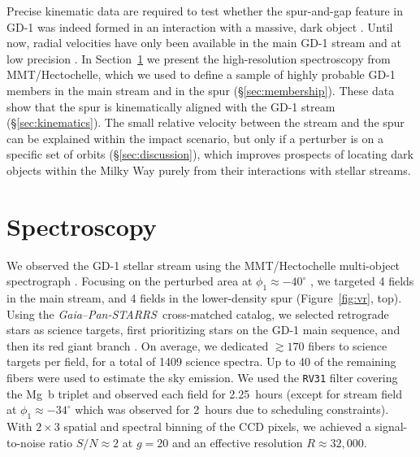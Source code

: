 \documentclass[twocolumn]{aastex63}
\newcommand{\gaia}{\textsl{Gaia}}
\newcommand{\pans}{\textsl{Pan-STARRS}}
\begin{document}
Precise kinematic data are required to test whether the spur-and-gap feature in GD-1 was indeed formed in an interaction with a massive, dark object \citep{bonaca2019a}.
Until now, radial velocities have only been available in the main GD-1 stream and at low precision \citep{koposov2010,huang2019}.
In Section~\ref{sec:spec} we present the high-resolution spectroscopy from MMT/Hectochelle, which we used to define a sample of highly probable GD-1 members in the main stream and in the spur (\S\ref{sec:membership}).
These data show that the spur is kinematically aligned with the GD-1 stream (\S\ref{sec:kinematics}).
The small relative velocity between the stream and the spur can be explained within the impact scenario, but only if a perturber is on a specific set of orbits (\S\ref{sec:discussion}), which improves prospects of locating dark objects within the Milky Way purely from their interactions with stellar streams.


\section{Spectroscopy}
\label{sec:spec}

We observed the GD-1 stellar stream using the MMT/Hectochelle multi-object spectrograph \citep{szentgyorgyi2011}.
Focusing on the perturbed area at $\phi_1\approx-40^\circ$ \citep[$\phi_{1,2}$ are coordinates oriented along and perpendicular to GD-1, respectively;][]{koposov2010}, we targeted 4 fields in the main stream, and 4 fields in the lower-density spur (Figure~\ref{fig:vr}, top).
Using the \gaia--\pans\ cross-matched catalog, we selected retrograde stars as science targets, first prioritizing stars on the GD-1 main sequence, and then its red giant branch \citep[see][]{pwb}.
On average, we dedicated $\gtrsim170$ fibers to science targets per field, for a total of 1409 science spectra.
Up to 40 of the remaining fibers were used to estimate the sky emission.
We used the \texttt{RV31} filter covering the Mg~b triplet and observed each field for 2.25~hours (except for stream field at $\phi_1\approx-34^\circ$ which was observed for 2~hours due to scheduling constraints).
With $2\times3$ spatial and spectral binning of the CCD pixels, we achieved a signal-to-noise ratio $S/N\approx2$ at $g=20$ and an effective resolution $R\approx32,000$.
\end{document}
